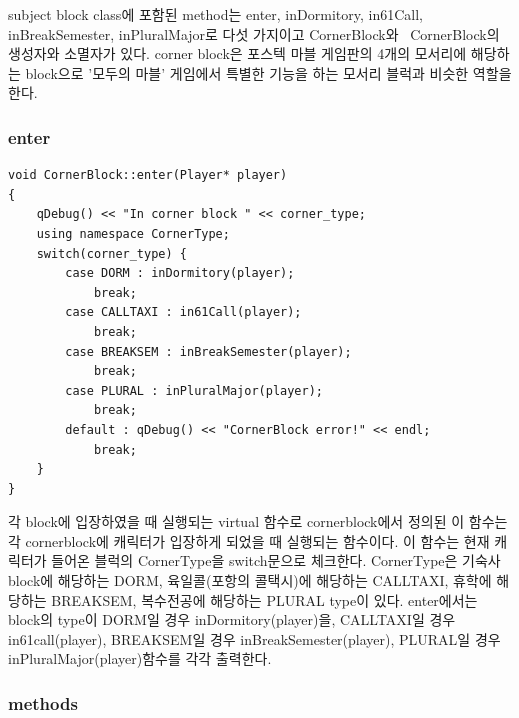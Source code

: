 \documentclass[10pt,oneside,a4paper,titlepage]{article}
\begin{document}
subject block class에 포함된 method는 enter, inDormitory, in61Call, inBreakSemester, inPluralMajor로 다섯 가지이고 CornerBlock와 ~CornerBlock의 생성자와 소멸자가 있다. corner block은 포스텍 마블 게임판의 4개의 모서리에 해당하는 block으로 '모두의 마블' 게임에서 특별한 기능을 하는 모서리 블럭과 비슷한 역할을 한다. 

\subsubsection{enter}

\begin{lstlisting}
void CornerBlock::enter(Player* player)
{
    qDebug() << "In corner block " << corner_type;
    using namespace CornerType;
    switch(corner_type) {
        case DORM : inDormitory(player);
            break;
        case CALLTAXI : in61Call(player);
            break;
        case BREAKSEM : inBreakSemester(player);
            break;
        case PLURAL : inPluralMajor(player);
            break;
        default : qDebug() << "CornerBlock error!" << endl;
            break;
    }
}
\end{lstlisting}

각 block에 입장하였을 때 실행되는 virtual 함수로 cornerblock에서 정의된 이 함수는 각 cornerblock에 캐릭터가 입장하게 되었을 때 실행되는 함수이다. 이 함수는 현재 캐릭터가 들어온 블럭의 CornerType을 switch문으로 체크한다. CornerType은 기숙사 block에 해당하는 DORM, 육일콜(포항의 콜택시)에 해당하는 CALLTAXI, 휴학에 해당하는 BREAKSEM, 복수전공에 해당하는 PLURAL type이 있다. enter에서는 block의 type이 DORM일 경우 inDormitory(player)을, CALLTAXI일 경우 in61call(player), BREAKSEM일 경우 inBreakSemester(player), PLURAL일 경우 inPluralMajor(player)함수를 각각 출력한다.

\subsubsection{methods}
\end{document}
